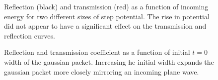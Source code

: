 \documentclass[singlepage,notitlepage,nofootinbib,11pt]{revtex4-1}
\begin{document}
\begin{figure}[h]
  \centering
  \captionsetup[subfigure]{labelformat=empty}
  \caption{\label{EoverV} Reflection (black) and transmission (red) as a function of incoming energy for two different sizes of step potential. The rise in potential did not appear to have a significant effect on the transmission and reflection curves.}
\end{figure}
\begin{figure}[h]
  \centering
  \captionsetup[subfigure]{labelformat=empty}
  \caption{\label{sigmas} Reflection and transmission coefficient as a function of initial $t=0$ width of the gaussian packet. Increasing he initial width expands the gaussian packet more closely mirroring an incoming plane wave.}
\end{figure}
\end{document}
